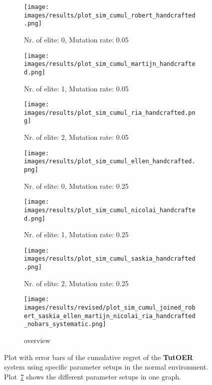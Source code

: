 \begin{figure}[ht]
	\begin{subfigure}{0.48\linewidth}
	\texttt{[image: images/results/plot\_sim\_cumul\_robert\_handcrafted.png]}
	\caption{Nr. of elite: 0, Mutation rate: 0.05}
	\label{fig:cumul_handcrafted_robert}
	\end{subfigure}
	\hfill
	\begin{subfigure}{0.48\linewidth}
	\texttt{[image: images/results/plot\_sim\_cumul\_martijn\_handcrafted.png]}
	\caption{Nr. of elite: 1, Mutation rate: 0.05}
	\label{fig:cumul_handcrafted_martijn}
	\end{subfigure}
	\begin{subfigure}{0.48\linewidth}
	\texttt{[image: images/results/plot\_sim\_cumul\_ria\_handcrafted.png]}
	\caption{Nr. of elite: 2, Mutation rate: 0.05}
	\label{fig:cumul_handcrafted_ria}
	\end{subfigure}
	\hfill
	\begin{subfigure}{0.48\linewidth}
	\texttt{[image: images/results/plot\_sim\_cumul\_ellen\_handcrafted.png]}
	\caption{Nr. of elite: 0, Mutation rate: 0.25}
	\label{fig:cumul_handcrafted_ellen}
	\end{subfigure}
	\begin{subfigure}{0.48\linewidth}
	\texttt{[image: images/results/plot\_sim\_cumul\_nicolai\_handcrafted.png]}
	\caption{Nr. of elite: 1, Mutation rate: 0.25}
	\label{fig:cumul_handcrafted_nicolai}
	\end{subfigure}
	\hfill
	\begin{subfigure}{0.48\linewidth}
	\texttt{[image: images/results/plot\_sim\_cumul\_saskia\_handcrafted.png]}
	\caption{Nr. of elite: 2, Mutation rate: 0.25}
	\label{fig:cumul_handcrafted_saskia}
	\end{subfigure}
	\begin{subfigure}{\linewidth}
	\texttt{[image: images/results/revised/plot\_sim\_cumul\_joined\_robert\_saskia\_ellen\_martijn\_nicolai\_ria\_handcrafted\_nobars\_systematic.png]}
	\caption{overview}
	\label{fig:cumul_handcrafted_overview_group2}
	\end{subfigure}
	\caption[Cumulative regret in normal simulated environment for group 2]{Plot with error bars of the cumulative regret of the \textbf{TutOER}
	system using specific parameter setups in the normal environment.
	Plot~\ref{fig:cumul_handcrafted_overview_group2} shows the
	different parameter setups in one graph.}
	\label{fig:cumul_handcrafted_container_group2}
\end{figure}

